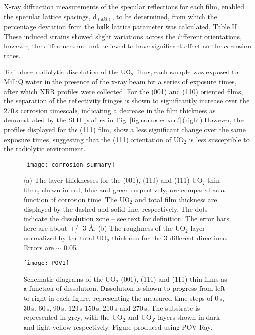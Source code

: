 \documentclass[twocolumn,prl,nobalancelastpage,aps,10pt]{revtex4-1}
\begin{document}
X-ray diffraction measurements of the specular reflections for each film, enabled the specular lattice spacings, d$_{(hkl)}$, to be determined, from which the percentage deviation from the bulk lattice parameter was calculated, Table II. These induced strains showed slight variations across the different orientations, however, the differences are not believed to have significant effect on the corrosion rates.

To induce radiolytic dissolution of the UO$_2$ films, each sample was exposed to MilliQ water in the presence of the x-ray beam for a series of exposure times, after which XRR profiles were collected. For the (001) and (110) oriented films, the separation of the reflectivity fringes is shown to significantly increase over the 270\,s corrosion timescale, indicating a decrease in the film thickness as demonstrated by the SLD profiles in Fig. \ref{fig:corrodedxrr2}\,(right) However, the profiles displayed for the (111) film, show a less significant change over the same exposure times, suggesting that the (111) orientation of UO$_2$ is less susceptible to the radiolytic environment.
\begin{figure*}

	\centering
	\texttt{[image: corrosion\_summary]}
	\caption{(a) The layer thicknesses for the (001), (110) and (111) UO$_2$ thin films, shown in red, blue and green respectively, are compared as a function of corrosion time. The UO$_2$ and total film thickness are displayed by the dashed and solid line, respectively. The dots indicate the dissolution zone – see text for definition. The error bars here are about +/- 3 \AA. (b) The roughness of the UO$_2$ layer normalized by the total UO$_2$ thickness for the 3 different directions. Errors are $\sim$ 0.05.}
	\label{fig:corrodedxrr5}
\end{figure*}

\begin{figure*}
	\centering
	\texttt{[image: POV1]}
	\caption{Schematic diagrams of the UO$_2$ (001), (110) and (111) thin films as a function of dissolution. Dissolution is shown to progress from left to right in each figure, representing the measured time steps of 0\,s, 30\,s, 60\,s, 90\,s, 120\,s 150\,s, 210\,s and 270\,s. The substrate is represented in grey, with the UO$_2$ and UO$_X$ layers shown in dark and light yellow respectively. Figure produced using POV-Ray.}
	\label{fig:POV}
\end{figure*}
\end{document}

